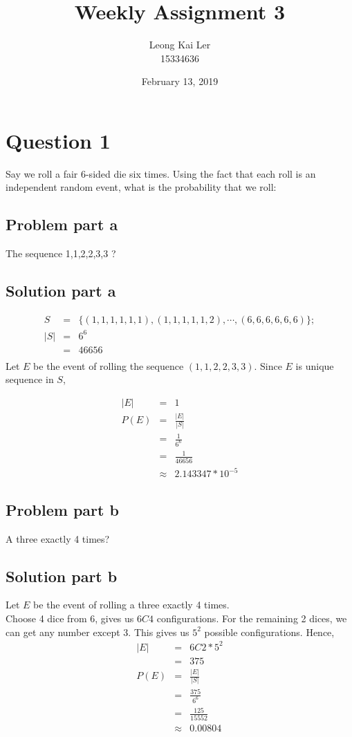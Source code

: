 \documentclass[12pt]{article}%
\makeatletter
\newcommand\abs[1]{\left|#1\right|}
\renewcommand{\maketitle}{\bgroup\setlength{\parindent}{0pt}
\begin{flushleft}
  \textbf{\@title}

  \@author
  \@date
\end{flushleft}\egroup
}
\makeatother
\begin{document}
\title{Weekly Assignment 3}
\author{Leong Kai Ler \\ 15334636 \\   }
\date{February 13, 2019}
\maketitle

\section*{Question 1}
Say we roll a fair 6-sided die six times. Using the fact that each roll is an independent random event, what is the probability that we roll: \\
 
\subsection*{Problem part a}
The sequence 1,1,2,2,3,3 ?
\subsection*{Solution part a}
\begin{eqnarray*}
S & = & \{(1,1,1,1,1,1),(1,1,1,1,1,2), \cdots ,(6,6,6,6,6,6)\}; \\
\abs{S} & = & 6^6 \\
		& = & 46656 \\
\end{eqnarray*}
Let $E$ be the event of rolling the sequence ${(1,1,2,2,3,3)}$. Since $E$ is unique sequence in $S$,

\begin{eqnarray*}
\abs{E} & = & 1 \\
P(E) & = & \frac{\abs{E}}{\abs{S}} \\
	 & = & \frac{1}{6^6} \\ 
	 & = & \frac{1}{46656} \\
	 & \approx & 2.143347 * 10^{-5}
\end{eqnarray*}

\subsection*{Problem part b}
A three exactly 4 times?
\subsection*{Solution part b}
Let $E$ be the event of rolling a three exactly 4 times. \\
Choose 4 dice from 6, gives us $6C4$ configurations. For the remaining 2 dices, we can get any number except 3. This gives us $5^2$ possible configurations. Hence,
\begin{eqnarray*}
\abs{E} & = & 6C2 * 5^2 \\
 		& = & 375 \\
P(E) & = & \frac{\abs{E}}{\abs{S}} \\
	 & = & \frac{375}{6^6} \\
	 & = & \frac{125}{15552} \\
	 & \approx & 0.00804 
\end{eqnarray*}
\end{document}
